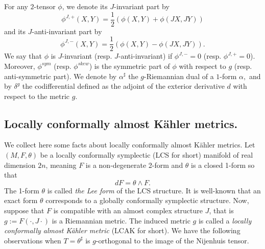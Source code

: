 \documentclass[a4paper,11pt]{amsart}
\theoremstyle{definition}
\renewcommand{\[}{\begin{equation*}}
\renewcommand{\]}{\end{equation*}}
\begin{document}
For any $2$-tensor $\phi$, we denote its $J$-invariant part by 
$$\phi^{J,+}(X,Y)=\frac{1}{2}\left(\phi(X,Y)+\phi(JX,JY)\right) $$ and its $J$-anti-invariant part by 
$$\phi^{J,-}(X,Y)=\frac{1}{2}\left(\phi(X,Y)-\phi(JX,JY)\right).$$ We say that $\phi$ is $J$-invariant (resp. $J$-anti-invariant) if $\phi^{J,-}=0$ (resp. $\phi^{J,+}=0$). Moreover, $\phi^{sym}$ (resp. $\phi^{skew}$) is the symmetric
part of $\phi$ with respect to $g$ (resp. anti-symmetric part). We denote by $\alpha^\sharp$ the $g$-Riemannian dual of a $1$-form $\alpha,$ and by $\delta^g$ the codifferential defined as the adjoint of the exterior derivative $d$ with respect to the metric $g.$ 

\subsection{Locally conformally almost K\"ahler metrics.}

We collect here some facts about locally conformally almost K\"ahler metrics. Let $(M, F, \theta)$ be a locally conformally symplectic (LCS for short) manifold of real dimension $2n$, meaning $F$ is a non-degenerate 2-form and $\theta$ is a closed 1-form so that
$$ dF = \theta \wedge F.$$
The 1-form $\theta$ is called {\it the Lee form} of the LCS structure. It is well-known that an exact form $\theta$ corresponds to a globally conformally symplectic structure. Now, suppose that $F$ is compatible with an almost complex structure $J$, that is $g:=F(\cdot,J\cdot)$ is a Riemannian metric. The induced metric $g$ is called a {\it locally conformally almost K\"ahler metric} (LCAK for short). We have the following observations when $T=\theta^\sharp$ is $g$-orthogonal to the image of the Nijenhuis tensor.
\end{document}
